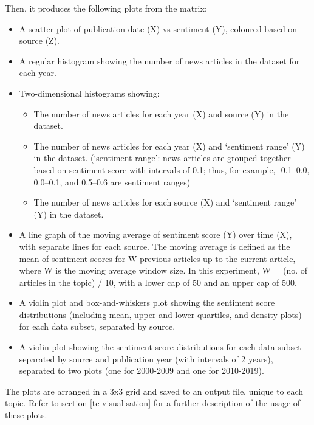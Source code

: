 \documentclass{report}
\begin{document}
Then, it produces the following plots from the matrix:
\begin{itemize}
	\item A scatter plot of publication date (X) vs sentiment (Y), coloured based on source (Z).
	\item A regular histogram showing the number of news articles in the dataset for each year.
	\item Two-dimensional histograms showing:
		\begin{itemize}
			\item The number of news articles for each year (X) and source (Y) in the dataset.
			\item The number of news articles for each year (X) and `sentiment range' (Y) in the dataset.
			(`sentiment range': news articles are grouped together based on sentiment score with intervals of 0.1; thus, for example, -0.1--0.0, 0.0--0.1, and 0.5--0.6 are sentiment ranges)
			\item The number of news articles for each source (X) and `sentiment range' (Y) in the dataset.
		\end{itemize}
	\item A line graph of the moving average of sentiment score (Y) over time (X), with separate lines for each source.
		The moving average is defined as the mean of sentiment scores for W previous articles up to the current article, where W is the moving average window size.
		In this experiment, W = (no. of articles in the topic) / 10, with a lower cap of 50 and an upper cap of 500.
	\item A violin plot \cite{hintze1998violin} and box-and-whiskers plot \cite{tukey1977exploratory} showing the sentiment score distributions (including mean, upper and lower quartiles, and density plots) for each data subset, separated by source.
	\item A violin plot showing the sentiment score distributions for each data subset separated by source and publication year (with intervals of 2 years), separated to two plots (one for 2000-2009 and one for 2010-2019).
\end{itemize}
The plots are arranged in a 3x3 grid and saved to an output file, unique to each topic. 
Refer to section \ref{tc-visualisation} for a further description of the usage of these plots.
\end{document}
